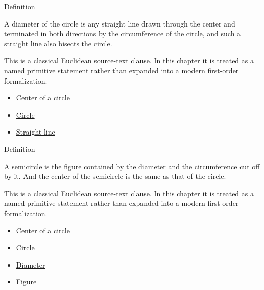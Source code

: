 \begin{definitionbox}{Definition}
\begin{definition}[Diameter]
\label{def:euclid-diameter}
A diameter of the circle is any straight line drawn through the center and
terminated in both directions by the circumference of the circle, and such a
straight line also bisects the circle.
\end{definition}
\end{definitionbox}
\begin{remark*}
This is a classical Euclidean source-text clause. In this chapter it is treated
as a named primitive statement rather than expanded into a modern first-order
formalization.
\end{remark*}

\begin{lra-not-visible}
\begin{dependencies}
\begin{itemize}
  \item \hyperref[def:euclid-center-of-a-circle]{Center of a circle}
  \item \hyperref[def:euclid-circle]{Circle}
  \item \hyperref[def:euclid-straight-line]{Straight line}
\end{itemize}
\end{dependencies}
\end{lra-not-visible}

\begin{definitionbox}{Definition}
\begin{definition}[Semicircle]
\label{def:euclid-semicircle}
A semicircle is the figure contained by the diameter and the circumference cut
off by it. And the center of the semicircle is the same as that of the circle.
\end{definition}
\end{definitionbox}
\begin{remark*}
This is a classical Euclidean source-text clause. In this chapter it is treated
as a named primitive statement rather than expanded into a modern first-order
formalization.
\end{remark*}

\begin{lra-not-visible}
\begin{dependencies}
\begin{itemize}
  \item \hyperref[def:euclid-center-of-a-circle]{Center of a circle}
  \item \hyperref[def:euclid-circle]{Circle}
  \item \hyperref[def:euclid-diameter]{Diameter}
  \item \hyperref[def:euclid-figure]{Figure}
\end{itemize}
\end{dependencies}
\end{lra-not-visible}

